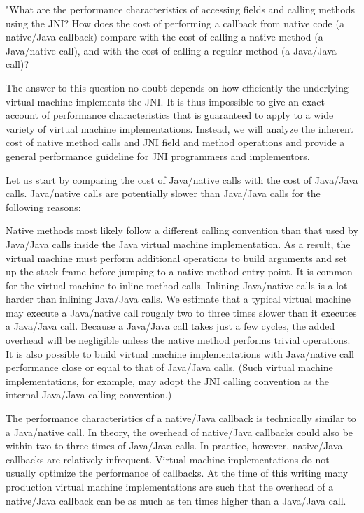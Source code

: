 \documentclass[a4paper,10pt]{report}
\begin{document}
"What are the performance characteristics of accessing fields and calling methods using the JNI? How does the cost of performing
a callback from native code (a native/Java callback) compare with the cost of calling a native method (a Java/native call), and
with the cost of calling a regular method (a Java/Java call)?

The answer to this question no doubt depends on how efficiently the underlying virtual machine implements the JNI. It is thus 
impossible to give an exact account of performance characteristics that is guaranteed to apply to a wide variety of virtual machine 
implementations. Instead, we will analyze the inherent cost of native method calls and JNI field and method operations and provide 
a general performance guideline for JNI programmers and implementors.

Let us start by comparing the cost of Java/native calls with the cost of Java/Java calls. Java/native calls are potentially slower 
than Java/Java calls for the following reasons:

Native methods most likely follow a different calling convention than that used by Java/Java calls inside the Java virtual machine 
implementation. As a result, the virtual machine must perform additional operations to build arguments and set up the stack frame 
before jumping to a native method entry point.
It is common for the virtual machine to inline method calls. Inlining Java/native calls is a lot harder than inlining Java/Java calls.
We estimate that a typical virtual machine may execute a Java/native call roughly two to three times slower than it executes a 
Java/Java call. Because a Java/Java call takes just a few cycles, the added overhead will be negligible unless the native method 
performs trivial operations. It is also possible to build virtual machine implementations with Java/native call performance close or 
equal to that of Java/Java calls. (Such virtual machine implementations, for example, may adopt the JNI calling convention as the 
internal Java/Java calling convention.)

The performance characteristics of a native/Java callback is technically similar to a Java/native call. In theory, the overhead 
of native/Java callbacks could also be within two to three times of Java/Java calls. In practice, however, native/Java callbacks 
are relatively infrequent. Virtual machine implementations do not usually optimize the performance of callbacks. At the time of this 
writing many production virtual machine implementations are such that the overhead of a native/Java callback can be as much as ten 
times higher than a Java/Java call.
\end{document}
